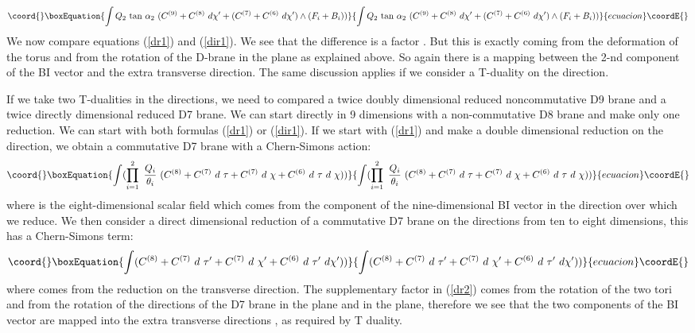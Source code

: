 \documentclass[a4paper,12pt]{article}
\begin{document}
\begin{equation}\coord{}\boxEquation{
\label{dir1}
\int Q_2~\mbox{tan}~\alpha_2~(C^{(9)} + C^{(8)}~d \chi' + (C^{(7)} 
+ C^{(6)}~d \chi') \wedge (F_i + B_i))
}{
\int Q_2~\mbox{tan}~\alpha_2~(C^{(9)} + C^{(8)}~d \chi' + (C^{(7)} 
+ C^{(6)}~d \chi') \wedge (F_i + B_i))
}{ecuacion}\coordE{}\end{equation}
We now compare equations (\ref{dr1}) and (\ref{dir1}). We see that the 
difference is a factor \coordHE{}.
But this is exactly coming from the deformation of the torus and from the
rotation of the D-brane in the \coordHE{} plane as explained above. 
So again there is a mapping between the 2-nd component of the BI vector and
the extra transverse direction.
The same discussion applies if we consider a T-duality on the \coordHE{} direction.

If we take two T-dualities in the \coordHE{} directions, we need to compared
a twice doubly dimensional reduced noncommutative D9 brane and a twice 
directly dimensional reduced D7 brane. We can start directly in 9 dimensions 
with a non-commutative D8 brane and make only one reduction. We can start with
both formulas (\ref{dr1}) or (\ref{dir1}). If we start with  (\ref{dr1}) and
make a double dimensional reduction on the \coordHE{} direction, we obtain a 
commutative D7 brane with a Chern-Simons action:
\begin{equation}\coord{}\boxEquation{
\label{dr2}
\int (\prod_{i=1}^{2}
~\frac{Q_i}{\theta_i}~(C^{(8)} + C^{(7)}~d~\tau + C^{(7)}~d~\chi + 
C^{(6)}~d~\tau~d~\chi))
}{
\int (\prod_{i=1}^{2}
~\frac{Q_i}{\theta_i}~(C^{(8)} + C^{(7)}~d~\tau + C^{(7)}~d~\chi + 
C^{(6)}~d~\tau~d~\chi))
}{ecuacion}\coordE{}\end{equation}
where \myHighlight{$\tau$}\coordHE{} is the eight-dimensional scalar field which comes from the
component of the nine-dimensional BI vector in the direction \coordHE{} over which
we reduce.
We then consider a direct dimensional reduction of a commutative 
D7 brane on the \coordHE{} directions from ten to eight 
dimensions, this has a Chern-Simons term:
\begin{equation}\coord{}\boxEquation{
\label{dir2}
\int (C^{(8)} + C^{(7)}~d~\tau' + C^{(7)}~d~\chi' + 
C^{(6)}~d~\tau'~d \chi'))
}{
\int (C^{(8)} + C^{(7)}~d~\tau' + C^{(7)}~d~\chi' + 
C^{(6)}~d~\tau'~d \chi'))
}{ecuacion}\coordE{}\end{equation}
where \coordHE{} comes from the reduction on the transverse direction.
The supplementary factor \coordHE{} 
in (\ref{dr2}) comes from the rotation of the two tori \coordHE{} and from 
the rotation of the directions of the D7 brane in the \coordHE{} plane and
in the \coordHE{} plane, therefore we see that the two components
\myHighlight{$\chi, \tau$}\coordHE{} of the BI vector are mapped into the extra transverse directions
\coordHE{}, as required by T duality.
\end{document}
